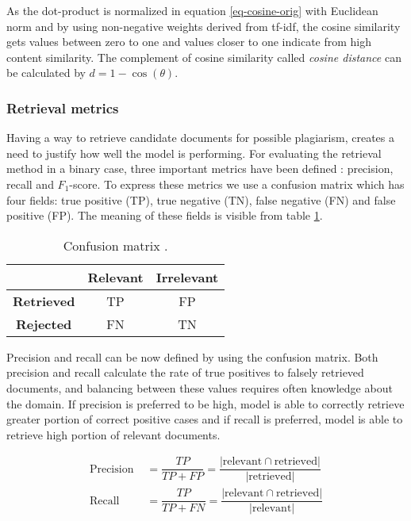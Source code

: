 \noindent
As the dot-product is normalized in equation \ref{eq-cosine-orig} with Euclidean norm and by using non-negative weights derived from tf-idf, the cosine similarity gets values between zero to one and values closer to one indicate from high content similarity. The complement of cosine similarity called \emph{cosine distance} can be calculated by $d = 1 - \cos(\theta)$.

\subsubsection{Retrieval metrics}

Having a way to retrieve candidate documents for possible plagiarism, creates a need to justify how well the model is performing. For evaluating the retrieval method in a binary case, three important metrics have been defined \cite{Manning:2008:IIR:1394399}: precision, recall and $F_1$-score. To express these metrics we use a confusion matrix which has four fields: true positive (TP), true negative (TN), false negative (FN) and false positive (FP). The meaning of these fields is visible from table \ref{tbl-confmatr-orig}.


\begin{table}[ht]
\centering
\caption{Confusion matrix \cite{Manning:2008:IIR:1394399}.}
\label{tbl-confmatr-orig}
\begin{tabular}{c|c|c}
          & \bf Relevant & \bf Irrelevant \\ \hline
\bf Retrieved & TP      & FP        \\
\bf Rejected  & FN      & TN       
\end{tabular}
\end{table}

Precision and recall can be now defined by using the confusion matrix. Both precision and recall calculate the rate of true positives to falsely retrieved documents, and balancing between these values requires often knowledge about the domain. If precision is preferred to be high, model is able to correctly retrieve greater portion of correct positive cases and if recall is preferred, model is able to retrieve high portion of relevant documents. 

\begin{align}
    \text{Precision } &= \dfrac{TP}{TP + FP} = \dfrac{|\text{relevant} \cap \text{retrieved}|}{|\text{retrieved}|}\\
    \text{Recall } &= \dfrac{TP}{TP + FN} = \dfrac{|\text{relevant} \cap \text{retrieved}|}{|\text{relevant}|}
\end{align}

